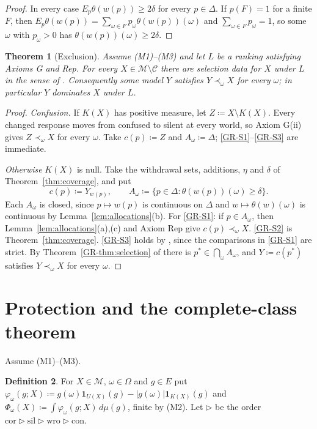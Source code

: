 \documentclass[11pt]{article}
\newtheorem{theorem}{Theorem}[section]
\theoremstyle{definition}
\newtheorem{definition}[theorem]{Definition}
\theoremstyle{remark}
\newcommand{\M}{\mathcal M}
\newcommand{\C}{\mathcal C}
\newcommand{\one}{\mathbf 1}
\newcommand{\cor}{\mathrm{cor}}
\newcommand{\sil}{\mathrm{sil}}
\newcommand{\wro}{\mathrm{wro}}
\newcommand{\con}{\mathrm{con}}
\begin{document}
\begin{proof}
In every case $E_p\theta(w(p))\ge2\delta$ for every $p\in\Delta$. If $p(F)=1$ for a finite $F$, then $E_p\theta(w(p))=\sum_{\omega\in F}p_\omega\theta(w(p))(\omega)$ and $\sum_{\omega\in F}p_\omega=1$, so some $\omega$ with $p_\omega>0$ has $\theta(w(p))(\omega)\ge2\delta$.
\end{proof}

\begin{theorem}[Exclusion]\label{thm:exclusion}
Assume (M1)--(M3) and let $L$ be a ranking satisfying Axioms G and Rep. For every $X\in\M\setminus\C$ there are selection data for $X$ under $L$ in the sense of \cite[Definition~\ref{GR-def:selection-data}]{KonekGR}. Consequently some model $Y$ satisfies $Y\prec_\omega X$ for every $\omega$; in particular $Y$ dominates $X$ under $L$.
\end{theorem}
\begin{proof}
\emph{Confusion.} If $K(X)$ has positive measure, let $Z\coloneqq X\setminus K(X)$. Every changed response moves from confused to silent at every world, so Axiom G(ii) gives $Z\prec_\omega X$ for every $\omega$. Take $c(p)\coloneqq Z$ and $A_\omega\coloneqq\Delta$; \ref{GR-S1}--\ref{GR-S3} are immediate.

\emph{Otherwise} $K(X)$ is null. Take the withdrawal sets, additions, $\eta$ and $\delta$ of Theorem~\ref{thm:coverage}, and put
\[
c(p)\coloneqq Y_{w(p)},\qquad A_\omega\coloneqq\{p\in\Delta:\theta(w(p))(\omega)\ge\delta\}.
\]
Each $A_\omega$ is closed, since $p\mapsto w(p)$ is continuous on $\Delta$ and $w\mapsto\theta(w)(\omega)$ is continuous by Lemma~\ref{lem:allocations}(b). For \ref{GR-S1}: if $p\in A_\omega$, then Lemma~\ref{lem:allocations}(a),(c) and Axiom Rep give $c(p)\prec_\omega X$. \ref{GR-S2} is Theorem~\ref{thm:coverage}. \ref{GR-S3} holds by \cite[Lemma~\ref{GR-lem:S3}(b)]{KonekGR}, since the comparisons in \ref{GR-S1} are strict. By Theorem~\ref{GR-thm:selection} of \cite{KonekGR} there is $p^*\in\bigcap_\omega A_\omega$, and $Y\coloneqq c(p^*)$ satisfies $Y\prec_\omega X$ for every $\omega$.
\end{proof}

\section{Protection and the complete-class theorem}\label{sec:protection}

Assume (M1)--(M3).

\begin{definition}\label{def:Phi}
For $X\in\M$, $\omega\in\Omega$ and $g\in E$ put $\varphi_\omega(g;X)\coloneqq g(\omega)\one_{U(X)}(g)-|g(\omega)|\one_{K(X)}(g)$ and $\Phi_\omega(X)\coloneqq\int\varphi_\omega(g;X)\,d\mu(g)$, finite by (M2). Let $\rhd$ be the order $\cor\rhd\sil\rhd\wro\rhd\con$.
\end{definition}
\end{document}
